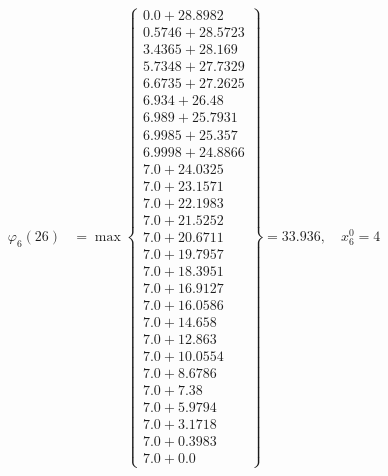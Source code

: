 \documentclass{article}
\begin{document}
\begin{align*}
\varphi_{6}(26) &= \max \left\{ \begin{array}{c}
0.0 + 28.8982 \\
 0.5746 + 28.5723 \\
 3.4365 + 28.169 \\
 5.7348 + 27.7329 \\
 6.6735 + 27.2625 \\
 6.934 + 26.48 \\
 6.989 + 25.7931 \\
 6.9985 + 25.357 \\
 6.9998 + 24.8866 \\
 7.0 + 24.0325 \\
 7.0 + 23.1571 \\
 7.0 + 22.1983 \\
 7.0 + 21.5252 \\
 7.0 + 20.6711 \\
 7.0 + 19.7957 \\
 7.0 + 18.3951 \\
 7.0 + 16.9127 \\
 7.0 + 16.0586 \\
 7.0 + 14.658 \\
 7.0 + 12.863 \\
 7.0 + 10.0554 \\
 7.0 + 8.6786 \\
 7.0 + 7.38 \\
 7.0 + 5.9794 \\
 7.0 + 3.1718 \\
 7.0 + 0.3983 \\
 7.0 + 0.0
\end{array} \right\}=33.936, \quad x_{6}^0=4\\
  

\end{align*}
\end{document}
